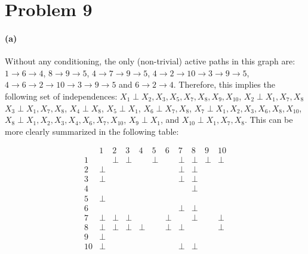 \documentclass[11pt]{article}
\begin{document}
\section{Problem 9}

\paragraph{(a)}

Without any conditioning, the only (non-trivial) active paths in this graph
are: $1 \to 6 \to 4$, $8 \to 9 \to 5$, $4 \to 7 \to 9 \to 5$,
$4 \to 2 \to 10 \to 3 \to 9 \to 5$, $4 \to 6 \to 2 \to 10 \to 3 \to 9 \to 5$
and $6 \to 2 \to 4$.
Therefore, this implies the following set of independences:
$X_1 \perp X_2, X_3, X_5, X_7, X_8, X_9, X_{10}$, {$X_2 \perp X_1, X_7, X_8$}
{$X_3 \perp X_1, X_7, X_8$},
{$X_4 \perp X_8$},
{$X_5 \perp X_1$},
{$X_6 \perp X_7, X_8$},
{$X_7 \perp X_1, X_2, X_3, X_6, X_8, X_{10}$},
{$X_8 \perp X_1, X_2, X_3, X_4, X_6, X_7, X_{10}$},
{$X_9 \perp X_1$}, and
{$X_{10} \perp X_1, X_7, X_8$}. This can be more clearly summarized in the
following table:

\begin{equation}
    \begin{array}{c|cccccccccc}
            & 1     & 2     & 3     & 4     & 5     & 6     & 7     & 8     & 9     & 10     \\\hline
        1   &       & \perp & \perp &       & \perp &       & \perp & \perp & \perp & \perp  \\
        2   & \perp &       &       &       &       &       & \perp & \perp &       &        \\
        3   & \perp &       &       &       &       &       & \perp & \perp &       &        \\
        4   &       &       &       &       &       &       &       & \perp &       &        \\
        5   & \perp &       &       &       &       &       &       &       &       &        \\
        6   &       &       &       &       &       &       & \perp & \perp &       &        \\
        7   & \perp & \perp & \perp &       &       & \perp &       & \perp &       & \perp  \\
        8   & \perp & \perp & \perp & \perp &       & \perp & \perp &       &       & \perp  \\
        9   & \perp &       &       &       &       &       &       &       &       &        \\
        10  & \perp &       &       &       &       &       & \perp & \perp &       &        \\
    \end{array}
\end{equation}
\end{document}
